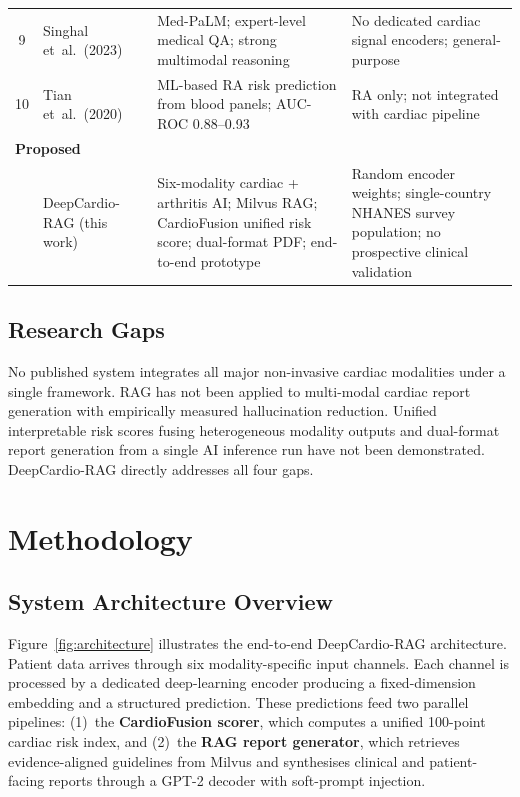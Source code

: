 \documentclass[AMA,STIX1COL,]{WileyNJD-v2}
\begin{document}
\begin{table}[!ht]
\begin{tabular}{c>{\raggedright\arraybackslash}p{2.8cm}>{\raggedright\arraybackslash}p{4.5cm}>{\raggedright\arraybackslash}p{4.5cm}}
9 & Singhal et~al.\ (2023)~\cite{singhal2023}
  & Med-PaLM; expert-level medical QA; strong multimodal reasoning
  & No dedicated cardiac signal encoders; general-purpose\\
10 & Tian et~al.\ (2020)~\cite{tian2020}
   & ML-based RA risk prediction from blood panels; AUC-ROC 0.88--0.93
   & RA only; not integrated with cardiac pipeline\\
\midrule
\multicolumn{4}{l}{\textbf{Proposed}} \\
 & DeepCardio-RAG (this work)
  & Six-modality cardiac + arthritis AI; Milvus RAG; CardioFusion unified risk score;
    dual-format PDF; end-to-end prototype
  & Random encoder weights; single-country NHANES survey population; no prospective clinical validation\\
\bottomrule
\end{tabular}
\end{table}

\subsection{Research Gaps}

No published system integrates all major non-invasive cardiac
modalities under a single framework. RAG has not been applied to
multi-modal cardiac report generation with empirically measured
hallucination reduction. Unified interpretable risk scores fusing
heterogeneous modality outputs and dual-format report generation from a
single AI inference run have not been demonstrated. DeepCardio-RAG
directly addresses all four gaps.

\section{Methodology}
\label{sec:methodology}

\subsection{System Architecture Overview}

Figure~\ref{fig:architecture} illustrates the end-to-end DeepCardio-RAG
architecture. Patient data arrives through six modality-specific input
channels. Each channel is processed by a dedicated deep-learning
encoder producing a fixed-dimension embedding and a structured
prediction. These predictions feed two parallel pipelines: (1)~the
\textbf{CardioFusion scorer}, which computes a unified 100-point
cardiac risk index, and (2)~the \textbf{RAG report generator}, which
retrieves evidence-aligned guidelines from Milvus and synthesises
clinical and patient-facing reports through a GPT-2 decoder with
soft-prompt injection.
\end{document}
